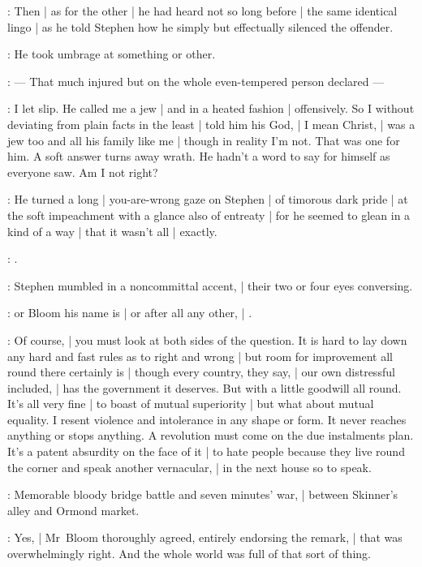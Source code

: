 :
Then |
as for the other |
he had heard not so long before |
the same identical lingo |
as he told Stephen how he simply but effectually silenced the offender.

\Bloom:
He took umbrage at something or other.

:
    --- That much injured but on the whole even-tempered person declared ---

\Bloom:
I let slip.
He called me a jew |
and in a heated fashion |
offensively.
So I without deviating from plain facts in the least |
told him his God, |
I mean Christ, |
was a jew too and all his family like me |
though in reality I'm not.
That was one for him.
A soft answer turns away wrath.
He hadn't a word to say for himself as everyone saw.
Am I not right?

:
He turned a long |
you-are-wrong gaze on Stephen |
of timorous dark pride |
at the soft impeachment with a glance also of entreaty |
for he seemed to glean in a kind of a way |
that it wasn't all |
exactly.

\Stephen:
.

:
Stephen mumbled in a noncommittal accent, |
their two or four eyes conversing.

\Stephen:
 or Bloom his name is |
or after all any other, |
.

\Bloom:
Of course, |
you must look at both sides of the question.
It is hard to lay down any hard and fast rules as to right and wrong |
but room for improvement all round there certainly is |
though every country, they say, |
our own distressful included, |
has the government it deserves.
But with a little goodwill all round.
It's all very fine |
to boast of mutual superiority |
but what about mutual equality.
I resent violence and intolerance in any shape or form.
It never reaches anything or stops anything.
A revolution must come on the due instalments plan.
It's a patent absurdity on the face of it |
to hate people because they live round the corner
and speak another vernacular, |
in the next house so to speak.

\Stephen:
Memorable bloody bridge battle and seven minutes' war, |
between Skinner's alley and Ormond market.

:
Yes, |
Mr~Bloom thoroughly agreed, entirely endorsing the remark, |
that was overwhelmingly right.
And the whole world was full of that sort of thing.

